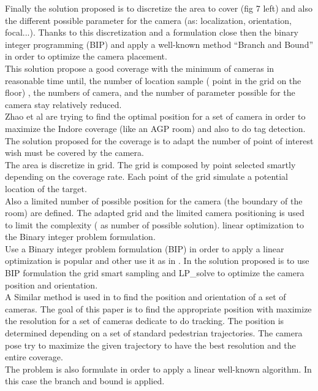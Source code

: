 Finally the solution proposed is to discretize the area to cover (fig 7 left) and also the different possible parameter for the camera (as: localization, orientation, focal...). Thanks to this discretization and a formulation close then the binary integer programming (BIP) and apply a well-known method “Branch and Bound” in order to optimize the camera placement.  \\
This solution  propose a  good  coverage with the minimum of cameras  in reasonable time until, the  number of location sample ( point in the grid on the floor) , the numbers of camera, and the number of parameter possible for the camera stay relatively  reduced.  \\
 
Zhao  et al \cite{22*zhao2008} are trying to find the optimal position for a set of camera in order to maximize the  Indore coverage (like an AGP room) and also to  do tag detection.
The solution proposed for the coverage is to adapt the number of point of interest wish must be covered by the camera. \\
The area is discretize in grid.  The grid is composed by point selected smartly depending on the coverage rate. Each point of the grid simulate a potential location of the target.\\
Also a limited number of possible position for the camera (the boundary of the room) are defined.
The adapted grid and the limited camera positioning is used to limit the complexity ( as number of possible solution).  linear optimization to the Binary integer problem formulation. \\
Use a Binary integer problem formulation (BIP) in order to apply a linear optimization is popular and other use it as in \cite{22*zhao2008,27*bodor2005,43*erdem2006}. In \cite{22*zhao2008} the solution proposed is to use BIP formulation the grid smart sampling and LP\_solve to optimize the camera position and orientation.\\

 A Similar method is used in \cite{27*bodor2005} to find the position and orientation of a set of cameras. The goal of this paper is to find the appropriate position with maximize the resolution for a set of cameras dedicate to do tracking. The position is determined depending on a set of standard pedestrian trajectories. The camera pose try to maximize the given trajectory to have the best resolution and the entire coverage. \\
The problem is also formulate in order to apply a linear well-known algorithm. In this case the branch and bound is applied.  

